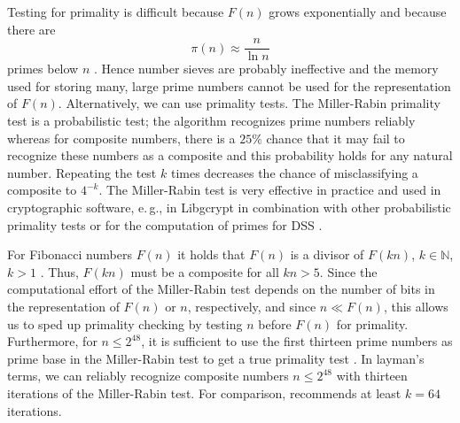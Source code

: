 \documentclass[%
	paper=a4,
	fontsize=10pt,
	DIV11,BCOR10mm,
	numbers=noenddot,
	abstract=yes
]{scrartcl}
\theoremstyle{definition}
\begin{document}
Testing for primality is difficult because $F(n)$ grows exponentially \cite[§6,
Theorem~1]{Hoggatt1969} and because there are
\[ \pi(n) \approx \frac{n}{\ln n} \]
primes below $n$ \cite[381\psq]{Knuth1998}. Hence number
sieves are probably ineffective and the memory used for storing many, large
prime numbers cannot be used for the representation of $F(n)$. Alternatively, we
can use primality tests. The Miller-Rabin primality test
\cite[395\psq]{Knuth1998} is a probabilistic test; the algorithm recognizes
prime numbers reliably whereas for composite numbers, there is a $25\%$ chance
that it may fail to recognize these numbers as a composite and this probability
holds for any natural number. Repeating the test $k$ times decreases the chance
of misclassifying a composite to $4^{-k}$. The Miller-Rabin test is very
effective in practice and used in cryptographic software, e.\,g., in Libgcrypt
in combination with other probabilistic primality tests \cite[§16.5]{libgcrypt}
or for the computation of primes for DSS \cite[\nopp C.3]{FIPS186-4}.

For Fibonacci numbers $F(n)$ it holds that $F(n)$ is a divisor of $F(kn)$, $k
\in \mathbb{N}$, $k > 1$ \cite[§7, Theorem~1]{Hoggatt1969}. Thus, $F(kn)$ must
be a composite for all $kn > 5$. Since the computational effort of the
Miller-Rabin test depends on the number of bits in the representation of $F(n)$
or $n$, respectively, and since $n \ll F(n)$, this allows us to sped up
primality checking by testing $n$ before $F(n)$ for primality. Furthermore, for
$n \leq 2^{48}$, it is sufficient to use the first thirteen prime numbers as
prime base in the Miller-Rabin test to get a true primality test
\cite{Sorensen2015}. In layman's terms, we can reliably recognize composite
numbers $n \leq 2^{48}$ with thirteen iterations of the Miller-Rabin test. For
comparison, \cite{FIPS186-4} recommends at least $k = 64$ iterations.

\printbibliography
\end{document}
